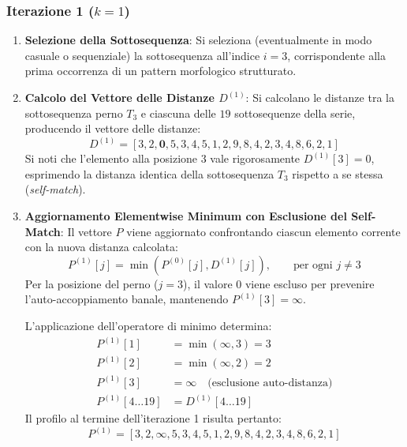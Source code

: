 \subsubsection{Iterazione 1 ($k = 1$)}
\begin{enumerate}
    \item \textbf{Selezione della Sottosequenza}: Si seleziona (eventualmente in modo casuale o sequenziale) la sottosequenza all'indice $i = 3$, corrispondente alla prima occorrenza di un pattern morfologico strutturato.
    \item \textbf{Calcolo del Vettore delle Distanze $D^{(1)}$}: Si calcolano le distanze tra la sottosequenza perno $T_3$ e ciascuna delle $19$ sottosequenze della serie, producendo il vettore delle distanze:
    \begin{equation}
    D^{(1)} = [3, 2, \mathbf{0}, 5, 3, 4, 5, 1, 2, 9, 8, 4, 2, 3, 4, 8, 6, 2, 1]
    \end{equation}
    Si noti che l'elemento alla posizione $3$ vale rigorosamente $D^{(1)}[3] = 0$, esprimendo la distanza identica della sottosequenza $T_3$ rispetto a se stessa (\textit{self-match}).
    
    \item \textbf{Aggiornamento Elementwise Minimum con Esclusione del Self-Match}:
    Il vettore $P$ viene aggiornato confrontando ciascun elemento corrente con la nuova distanza calcolata:
    \begin{equation}
    P^{(1)}[j] = \min(P^{(0)}[j], D^{(1)}[j]), \qquad \text{per ogni } j \neq 3
    \end{equation}
    Per la posizione del perno ($j = 3$), il valore $0$ viene escluso per prevenire l'auto-accoppiamento banale, mantenendo $P^{(1)}[3] = \infty$.
    
    L'applicazione dell'operatore di minimo determina:
    \begin{align}
    P^{(1)}[1] &= \min(\infty, 3) = 3 \\
    P^{(1)}[2] &= \min(\infty, 2) = 2 \\
    P^{(1)}[3] &= \infty \quad \text{(esclusione auto-distanza)} \\
    P^{(1)}[4 \dots 19] &= D^{(1)}[4 \dots 19]
    \end{align}
    Il profilo al termine dell'iterazione 1 risulta pertanto:
    \begin{equation}
    P^{(1)} = [3, 2, \boldsymbol{\infty}, 5, 3, 4, 5, 1, 2, 9, 8, 4, 2, 3, 4, 8, 6, 2, 1]
    \end{equation}
\end{enumerate}

